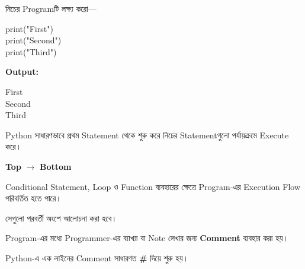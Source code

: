 

নিচের Programটি লক্ষ্য করো—

\begin{codebox}

\begin{english}
\ttfamily
print("First")\\
print("Second")\\
print("Third")
\end{english}

\end{codebox}

\textbf{Output:}

\begin{codebox}

\begin{english}
\ttfamily
First\\
Second\\
Third
\end{english}

\end{codebox}

Python সাধারণভাবে প্রথম Statement থেকে শুরু করে নিচের
Statementগুলো পর্যায়ক্রমে Execute করে।

\begin{center}

\textbf{Top}
\(\longrightarrow\)
\textbf{Bottom}

\end{center}

\begin{rememberbox}

Conditional Statement, Loop ও Function ব্যবহারের ক্ষেত্রে
Program-এর Execution Flow পরিবর্তিত হতে পারে।

সেগুলো পরবর্তী অংশে আলোচনা করা হবে।

\end{rememberbox}



Program-এর মধ্যে Programmer-এর ব্যাখ্যা বা Note লেখার জন্য
\textbf{Comment} ব্যবহার করা হয়।

Python-এ এক লাইনের Comment সাধারণত
\textbf{\textenglish{\ttfamily \#}}
দিয়ে শুরু হয়।

